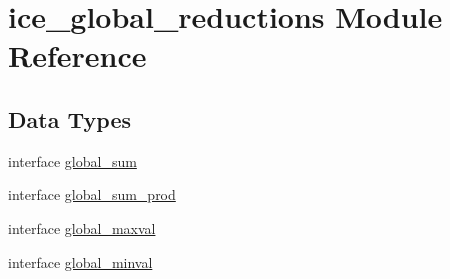 \hypertarget{namespaceice__global__reductions}{
\section{ice\_\-global\_\-reductions Module Reference}
\label{namespaceice__global__reductions}
}
\subsection*{Data Types}
\begin{DoxyCompactItemize}
\item 
interface \hyperlink{interfaceice__global__reductions_1_1global__sum}{global\_\-sum}
\item 
interface \hyperlink{interfaceice__global__reductions_1_1global__sum__prod}{global\_\-sum\_\-prod}
\item 
interface \hyperlink{interfaceice__global__reductions_1_1global__maxval}{global\_\-maxval}
\item 
interface \hyperlink{interfaceice__global__reductions_1_1global__minval}{global\_\-minval}
\end{DoxyCompactItemize}
